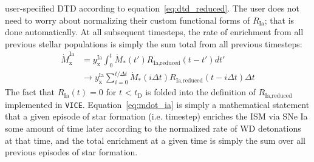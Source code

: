 \documentclass{report}
\begin{document}
user-specified DTD according to equation~\ref{eq:dtd_reduced}. The user does 
not need to worry about normalizing their custom functional forms of 
$R_\text{Ia}$; that is done automatically. At all subsequent timesteps, the 
rate of enrichment from all previous stellar populations is simply the sum 
total from all previous timesteps: 
\begin{subequations}\begin{align}
\label{eq:mdot_ia}
\dot{M}_\text{x}^\text{Ia} &= y_\text{x}^\text{Ia}\int_0^t\dot{M}_*(t')
R_\text{Ia,reduced}(t - t')dt'
\\
&\rightarrow y_\text{x}^\text{Ia}\sum_{i = 0}^{t/\Delta t}\dot{M}_*(i\Delta t)
R_\text{Ia,reduced} (t - i\Delta t)\Delta t 
\end{align}\end{subequations}
The fact that $R_\text{Ia}(t) = 0$ for $t$ < $t_\text{D}$ is folded into the 
definition of $R_\text{Ia,reduced}$ implemented in \texttt{VICE}. 
Equation~\ref{eq:mdot_ia} is simply a mathematical statement that a given 
episode of star formation (i.e. timestep) enriches the ISM via SNe Ia some 
amount of time later according to the normalized rate of WD detonations at 
that time, and the total enrichment at a given time is simply the sum over all 
previous episodes of star formation. 
\end{document}
